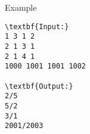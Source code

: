 Example
\begin{verbatim}
\textbf{Input:}
1 3 1 2
2 1 3 1
2 1 4 1
1000 1001 1001 1002

\textbf{Output:}
2/5
5/2
3/1
2001/2003
\end{verbatim}